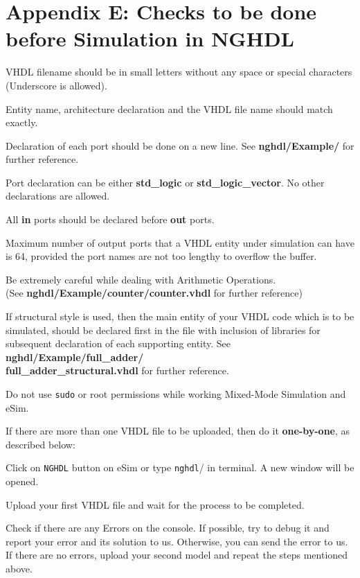 \section {Appendix E: Checks to be done before Simulation in NGHDL}
\begin{compactenum}
\item VHDL filename should be in small letters without any space or special characters (Underscore is allowed).
\item Entity name, architecture declaration and the VHDL file name should match exactly.
\item Declaration of each port should be done on a new line. See \textbf{nghdl/Example/} for further reference.
\item Port declaration can be either \textbf{std\_logic} or \textbf{std\_logic\_vector}. No other declarations are allowed.
\item All \textbf{in} ports should be declared before \textbf{out} ports.
\item Maximum number of output ports that a VHDL entity under simulation can have is 64, provided the port names are not too lengthy to overflow the buffer.
\item Be extremely careful while dealing with Arithmetic Operations. \\ 
(See \textbf{nghdl/Example/counter/counter.vhdl} for further reference)
\item If structural style is used, then the main entity of your VHDL code which is to be simulated,  should be declared first in the file with inclusion of libraries for subsequent declaration of each supporting entity.
See \textbf{nghdl/Example/full\_adder/ \\ full\_adder\_structural.vhdl} for further reference.
\item Do not use \texttt{sudo} or root permissions while working Mixed-Mode Simulation and eSim.
\item If there are more than one VHDL file to be uploaded, then do it \textbf{one-by-one}, as described below:
    \begin{compactenum}
    \item Click on \texttt{NGHDL} button on eSim or type \texttt{nghdl}/ in terminal. A new window will be opened.
    \item Upload your first VHDL file and wait for the process to be completed.
    \item Check if there are any Errors on the console. If possible, try to debug it and report 
        your error and its solution to us. Otherwise, you can send the error to us. If there are no errors, upload your second model and repeat the steps mentioned above. \\

\end{compactenum}
\end{compactenum}
